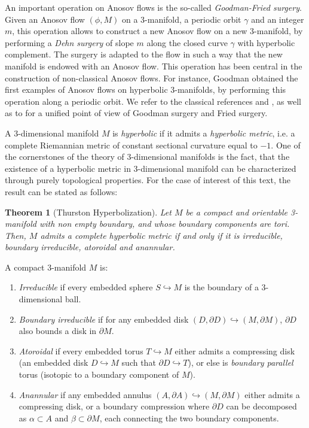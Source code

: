 \documentclass[12pt]{amsart}
\newtheorem{theorem}{Theorem}[section]
\theoremstyle{definition}
\theoremstyle{remark}
\begin{document}
An important operation on Anosov flows is the so-called \emph{Goodman-Fried surgery}. Given an Anosov flow $(\phi,M)$ on a 3-manifold, a periodic orbit $\gamma$ and an integer $m$, this operation allows to construct a new Anosov flow on a new 3-manifold, by performing a \emph{Dehn surgery} of slope $m$ along the closed curve $\gamma$ with hyperbolic complement. The surgery is adapted to the flow in such a way that the new manifold is endowed with an Anosov flow. This operation has been central in the construction of non-classical Anosov flows. For instance, Goodman obtained the first examples of Anosov flows on hyperbolic 3-manifolds, by performing this operation along a periodic orbit. We refer to the classical references \cite{Goodman1983DehnSurgery} and \cite{Fried1983Transitive}, as well as to \cite{shannon_thesis} for a unified point of view of Goodman surgery and Fried surgery.



A 3-dimensional manifold $M$ is \emph{hyperbolic} if it admits a \emph{hyperbolic metric}, i.e. a complete Riemannian metric of constant sectional curvature equal to $-1$. One of the cornerstones of the theory of 3-dimensional manifolds is the fact, that the existence of a hyperbolic metric in 3-dimensional manifold can be characterized through purely topological properties. For the case of interest of this text, the result can be stated as follows:


\begin{theorem}[Thurston Hyperbolization]
\label{thm_hyperbolization}
Let $M$ be a compact and orientable 3-manifold with non empty boundary, and  whose boundary components are tori. Then, $M$ admits a complete hyperbolic metric if and only if it is \emph{irreducible}, \emph{boundary irreducible}, \emph{atoroidal} and \emph{anannular}. 
\end{theorem}


A compact 3-manifold $M$ is:
\begin{enumerate}
    \item \emph{Irreducible} if every embedded sphere $S\hookrightarrow M$ is the boundary of a 3-dimensional ball.

    \item \emph{Boundary irreducible} if for any embedded disk  $(D,\partial D)\hookrightarrow (M,\partial M)$, $\partial D$ also bounds a disk in $\partial M$. 

    \item \emph{Atoroidal} if every embedded torus $T\hookrightarrow M$ either admits a compressing disk (an embedded disk $D\hookrightarrow M$ such that $\partial D\hookrightarrow T$), or else is \emph{boundary parallel} torus (isotopic to a boundary component of $M$).

    \item \emph{Anannular} if any embedded annulus $(A,\partial A)\hookrightarrow (M,\partial M)$ either admits a compressing disk, or a boundary compression where $\partial D$ can be decomposed as $\alpha\subset A$ and $\beta\subset \partial M$, each connecting the two boundary components.
\end{enumerate}
\end{document}
